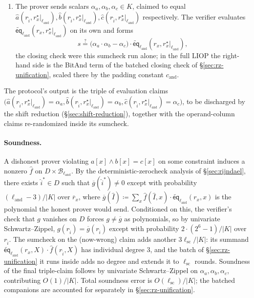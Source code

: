 \documentclass{article}
\theoremstyle{definition}
\newcommand*{\mle}{\widetilde}
\newcommand{\eq}{\mathsf{eq}}
\newcommand{\BB}{\mathcal{B}}
\begin{document}
\begin{enumerate}
\item The prover sends scalars $\alpha_a, \alpha_b, \alpha_c \in K$, claimed to equal $\widehat{a}(r_{\widehat{i}}, r^\star_x|_{\ell_\text{and}}), \widehat{b}(r_{\widehat{i}}, r^\star_x|_{\ell_\text{and}}), \widehat{c}(r_{\widehat{i}}, r^\star_x|_{\ell_\text{and}})$ respectively. The verifier evaluates $\mle{\eq}_{\ell_\text{and}}(r_x, r^\star_x|_{\ell_\text{and}})$ on its own and forms
  \[
    s \stackrel{?}{=} \bigl( \alpha_a \cdot \alpha_b - \alpha_c \bigr) \cdot \mle{\eq}_{\ell_\text{and}}(r_x, r^\star_x|_{\ell_\text{and}}),
  \]
  the closing check were this sumcheck run alone; in the full LIOP the right-hand side is the BitAnd term of the batched closing check of \S\ref{sec:rz-unification}, scaled there by the padding constant $c_\text{and}$.
\end{enumerate}

The protocol's output is the triple of evaluation claims $\bigl( \widehat{a}(r_{\widehat{i}}, r^\star_x|_{\ell_\text{and}}) = \alpha_a, \widehat{b}(r_{\widehat{i}}, r^\star_x|_{\ell_\text{and}}) = \alpha_b, \widehat{c}(r_{\widehat{i}}, r^\star_x|_{\ell_\text{and}}) = \alpha_c \bigr)$, to be discharged by the shift reduction (\S\ref{sec:shift-reduction}), together with the operand-column claims re-randomized inside its sumcheck.

\paragraph{Soundness.}
A dishonest prover violating $a[x] \land b[x] = c[x]$ on some constraint induces a nonzero $\widehat{f}$ on $D \times \BB_{\ell_\text{and}}$. By the deterministic-zerocheck analysis of \S\ref{sec:rijndael}, there exists $\widehat{i}^* \in D$ such that $\overline{g}(\widehat{i}^*) \neq 0$ except with probability $(\ell_\text{and} - 3) / |K|$ over $\overline{r}_x$, where $\overline{g}(\widehat{I}) \coloneqq \sum_x \widehat{f}(\widehat{I}, x) \cdot \mle{\eq}_{\ell_\text{and}}(r_x, x)$ is the polynomial the honest prover would send. Conditioned on this, the verifier's check that $g$ vanishes on $D$ forces $g \neq \overline{g}$ as polynomials, so by univariate Schwartz--Zippel, $g(r_{\widehat{i}}) = \overline{g}(r_{\widehat{i}})$ except with probability $2 \cdot (2^6 - 1) / |K|$ over $r_{\widehat{i}}$. The sumcheck on the (now-wrong) claim adds another $3 \ell_\text{sc} / |K|$: its summand $\mle{\eq}_{\ell_\text{and}}(r_x, X) \cdot \widehat{f}(r_{\widehat{i}}, X)$ has individual degree $3$, and the batch of \S\ref{sec:rz-unification} it runs inside adds no degree and extends it to $\ell_\text{sc}$ rounds. Soundness of the final triple-claim follows by univariate Schwartz--Zippel on $\alpha_a, \alpha_b, \alpha_c$, contributing $O(1) / |K|$. Total soundness error is $O(\ell_\text{sc}) / |K|$; the batched companions are accounted for separately in \S\ref{sec:rz-unification}.
\end{document}
